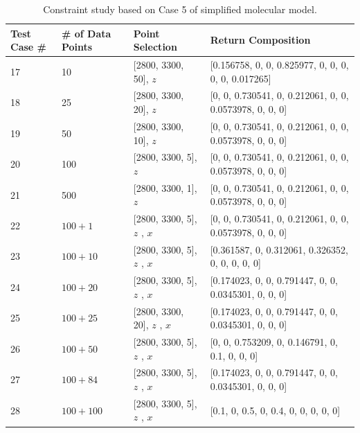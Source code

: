 \begin{table}[ht!] 
\begin{center} \tiny
{\def\arraystretch{1.5}
\begin{tabular}{| p{1cm} | p{2cm} | p{4cm}  | l |}
\hline
Test Case \# & \# of Data Points & Point Selection & Return Composition \\ \hline
17 & 10 & [2800, 3300, 50], $z$ & [0.156758, 0, 0, 0.825977, 0, 0, 0, 0, 0, 0.017265] \\ \hline
18 & 25 & [2800, 3300, 20], $z$ & [0, 0, 0.730541, 0, 0.212061, 0, 0, 0.0573978, 0, 0, 0] \\ \hline
19 & 50 & [2800, 3300, 10], $z$ & [0, 0, 0.730541, 0, 0.212061, 0, 0, 0.0573978, 0, 0, 0] \\ \hline
20 & 100 & [2800, 3300, 5], $z$ & [0, 0, 0.730541, 0, 0.212061, 0, 0, 0.0573978, 0, 0, 0] \\ \hline
21 & 500 & [2800, 3300, 1], $z$ & [0, 0, 0.730541, 0, 0.212061, 0, 0, 0.0573978, 0, 0, 0] \\ \hline	
22 & $100 + 1$ & [2800, 3300, 5], $z$ \newline [2800, 3300, 500], $x$  & [0, 0, 0.730541, 0, 0.212061, 0, 0, 0.0573978, 0, 0, 0] \\ \hline
23 & $100 + 10$ & [2800, 3300, 5], $z$ \newline [2800, 3300, 50], $x$  & [0.361587, 0, 0.312061, 0.326352, 0, 0, 0, 0, 0] \\ \hline
24 & $100 + 20$ & [2800, 3300, 5], $z$ \newline [2800, 3300, 25], $x$  & [0.174023, 0, 0, 0.791447, 0, 0, 0.0345301, 0, 0, 0] \\ \hline
25 & $100 + 25$ & [2800, 3300, 20], $z$ \newline [2800, 3300, 20], $x$  & [0.174023, 0, 0, 0.791447, 0, 0, 0.0345301, 0, 0, 0] \\ \hline
26 & $100 + 50$ & [2800, 3300, 5], $z$ \newline [2800, 3300, 10], $x$  & [0, 0, 0.753209, 0, 0.146791, 0, 0.1, 0, 0, 0] \\ \hline
27 & $100 + 84$ & [2800, 3300, 5], $z$ \newline [2800, 3300, 6], $x$  & [0.174023, 0, 0, 0.791447, 0, 0, 0.0345301, 0, 0, 0] \\ \hline
28 & $100 + 100$ & [2800, 3300, 5], $z$ \newline [2800, 3300, 5], $x$  & [0.1, 0, 0.5, 0, 0.4, 0, 0, 0, 0, 0] \\ 
\hline
\end{tabular} \\
}
\caption{Constraint study based on Case 5 of simplified molecular model.}\label{tab:7.4}
\end{center}
\end{table}
